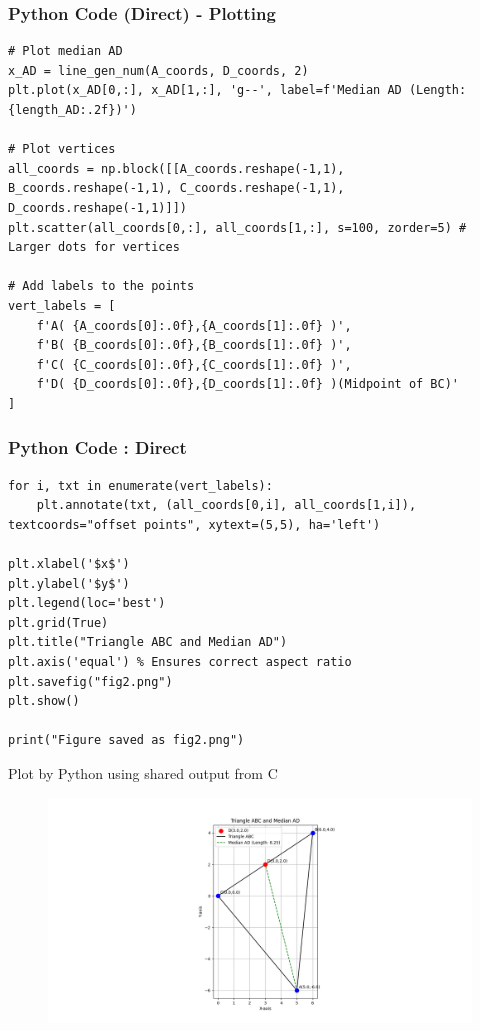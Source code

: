 \documentclass{beamer}
\begin{document}
\begin{frame}[fragile]
\frametitle{Python Code (Direct) - Plotting}
\begin{lstlisting}[style=PythonStyle]
# Plot median AD
x_AD = line_gen_num(A_coords, D_coords, 2)
plt.plot(x_AD[0,:], x_AD[1,:], 'g--', label=f'Median AD (Length: {length_AD:.2f})')

# Plot vertices
all_coords = np.block([[A_coords.reshape(-1,1), B_coords.reshape(-1,1), C_coords.reshape(-1,1), D_coords.reshape(-1,1)]])
plt.scatter(all_coords[0,:], all_coords[1,:], s=100, zorder=5) # Larger dots for vertices

# Add labels to the points
vert_labels = [
    f'A( {A_coords[0]:.0f},{A_coords[1]:.0f} )',
    f'B( {B_coords[0]:.0f},{B_coords[1]:.0f} )',
    f'C( {C_coords[0]:.0f},{C_coords[1]:.0f} )',
    f'D( {D_coords[0]:.0f},{D_coords[1]:.0f} )(Midpoint of BC)'
]
\end{lstlisting}

\end{frame}
\begin{frame}[fragile]
\frametitle{Python Code : Direct}

\begin{lstlisting}
for i, txt in enumerate(vert_labels):
    plt.annotate(txt, (all_coords[0,i], all_coords[1,i]), textcoords="offset points", xytext=(5,5), ha='left')

plt.xlabel('$x$')
plt.ylabel('$y$')
plt.legend(loc='best')
plt.grid(True)
plt.title("Triangle ABC and Median AD")
plt.axis('equal') % Ensures correct aspect ratio
plt.savefig("fig2.png")
plt.show()

print("Figure saved as fig2.png")
\end{lstlisting}
\end{frame}


\begin{frame}{Plot by Python using shared output from C}
\begin{figure}[H]
        \centering
        \includegraphics[width=1.0\columnwidth]{../figs/fig1.png}
        \caption{}
        \label{fig:1}
    \end{figure}
\end{frame}
\end{document}
